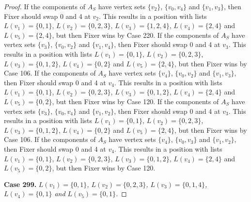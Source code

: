 \documentclass[12pt]{amsart}
\theoremstyle{plain}
\theoremstyle{definition}
\theoremstyle{remark}
\begin{document}
\begin{proof}
If the components of $A_S$ have vertex sets $\{v_2\}$, $\{v_0, v_4\}$ and $\{v_1, v_3\}$, then Fixer should swap 0 and 4 at $v_2$. This results in a position with lists $L(v_1) = \{0, 1\}$, $L(v_2) = \{0, 2, 3\}$, $L(v_3) = \{1, 2, 4\}$, $L(v_4) = \{2, 4\}$ and $L(v_5) = \{2, 4\}$, but then Fixer wins by Case 220. If the components of $A_S$ have vertex sets $\{v_3\}$, $\{v_0, v_2\}$ and $\{v_1, v_4\}$, then Fixer should swap 0 and 4 at $v_3$. This results in a position with lists $L(v_1) = \{0, 1\}$, $L(v_2) = \{0, 2, 3\}$, $L(v_3) = \{0, 1, 2\}$, $L(v_4) = \{0, 2\}$ and $L(v_5) = \{2, 4\}$, but then Fixer wins by Case 106. If the components of $A_S$ have vertex sets $\{v_4\}$, $\{v_0, v_2\}$ and $\{v_1, v_3\}$, then Fixer should swap 0 and 4 at $v_4$. This results in a position with lists $L(v_1) = \{0, 1\}$, $L(v_2) = \{0, 2, 3\}$, $L(v_3) = \{0, 1, 2\}$, $L(v_4) = \{2, 4\}$ and $L(v_5) = \{0, 2\}$, but then Fixer wins by Case 120. If the components of $A_S$ have vertex sets $\{v_3\}$, $\{v_0, v_4\}$ and $\{v_1, v_2\}$, then Fixer should swap 0 and 4 at $v_3$. This results in a position with lists $L(v_1) = \{0, 1\}$, $L(v_2) = \{0, 2, 3\}$, $L(v_3) = \{0, 1, 2\}$, $L(v_4) = \{0, 2\}$ and $L(v_5) = \{2, 4\}$, but then Fixer wins by Case 106. If the components of $A_S$ have vertex sets $\{v_4\}$, $\{v_0, v_3\}$ and $\{v_1, v_2\}$, then Fixer should swap 0 and 4 at $v_4$. This results in a position with lists $L(v_1) = \{0, 1\}$, $L(v_2) = \{0, 2, 3\}$, $L(v_3) = \{0, 1, 2\}$, $L(v_4) = \{2, 4\}$ and $L(v_5) = \{0, 2\}$, but then Fixer wins by Case 120. 

\noindent\textbf{Case 299.  }\textit{$L(v_1) = \{0, 1\}$, $L(v_2) = \{0, 2, 3\}$, $L(v_3) = \{0, 1, 4\}$, $L(v_4) = \{0, 1\}$ and $L(v_5) = \{0, 1\}$.}


\end{proof}
\end{document}
